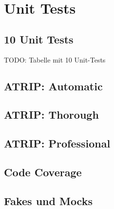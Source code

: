 \chapter{Unit Tests}
\section{10 Unit Tests}
TODO: Tabelle mit 10 Unit-Tests
\section{ATRIP: Automatic}

\section{ATRIP: Thorough}

\section{ATRIP: Professional}

\section{Code Coverage}

\section{Fakes und Mocks}
